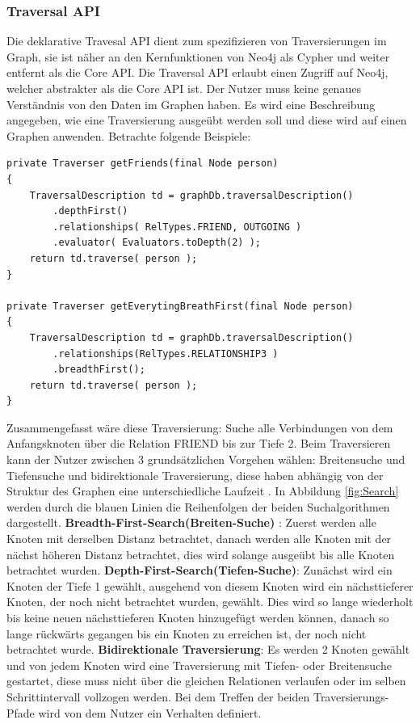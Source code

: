\subsubsection{Traversal API}
Die deklarative Travesal API dient zum spezifizieren von Traversierungen im Graph, sie ist näher an den Kernfunktionen von Neo4j als Cypher und weiter entfernt als die Core API. Die Traversal API erlaubt einen Zugriff auf Neo4j, welcher  abstrakter als die Core API ist. Der Nutzer muss keine genaues Verständnis von den Daten im Graphen haben. Es wird eine Beschreibung angegeben, wie eine Traversierung  ausgeübt werden soll und diese wird auf einen Graphen anwenden. Betrachte folgende Beispiele:
\begin{Verbatim}[frame=single]
private Traverser getFriends(final Node person)
{
	TraversalDescription td = graphDb.traversalDescription()
		.depthFirst()
		.relationships( RelTypes.FRIEND, OUTGOING )
		.evaluator( Evaluators.toDepth(2) );
	return td.traverse( person );
}

private Traverser getEverytingBreathFirst(final Node person)
{
	TraversalDescription td = graphDb.traversalDescription()
		.relationships(RelTypes.RELATIONSHIP3 )
		.breadthFirst();
	return td.traverse( person );
}
\end{Verbatim}
Zusammengefasst wäre diese Traversierung: Suche alle Verbindungen von dem Anfangsknoten über die Relation FRIEND bis zur Tiefe 2.  Beim Traversieren kann der  Nutzer zwischen 3 grundsätzlichen Vorgehen wählen: Breitensuche und Tiefensuche und bidirektionale Traversierung, diese haben abhängig von der Struktur des Graphen eine unterschiedliche Laufzeit \parencite{vukotic2015neo4j}. In  Abbildung \ref{fig:Search} werden durch die blauen Linien die Reihenfolgen der beiden Suchalgorithmen dargestellt. \newline
\textbf {Breadth-First-Search(Breiten-Suche)} : Zuerst werden alle Knoten mit derselben Distanz betrachtet, danach werden alle Knoten mit der nächst höheren Distanz betrachtet, dies wird solange ausgeübt bis alle Knoten betrachtet wurden. \newline
\textbf {Depth-First-Search(Tiefen-Suche)}: Zunächst wird ein Knoten der Tiefe 1 gewählt, ausgehend von diesem Knoten wird ein nächsttieferer Knoten, der noch nicht betrachtet wurden, gewählt. Dies wird so lange wiederholt bis keine neuen nächsttieferen Knoten hinzugefügt werden können, danach so lange rückwärts gegangen bis ein Knoten zu erreichen ist, der noch nicht betrachtet wurde. \newline
\textbf {Bidirektionale Traversierung}: Es werden 2 Knoten gewählt und von jedem Knoten wird eine Traversierung  mit Tiefen- oder Breitensuche gestartet, diese muss nicht über die gleichen Relationen verlaufen oder im selben Schrittintervall vollzogen werden. Bei dem Treffen der beiden Traversierungs-Pfade wird von dem Nutzer ein Verhalten definiert.
